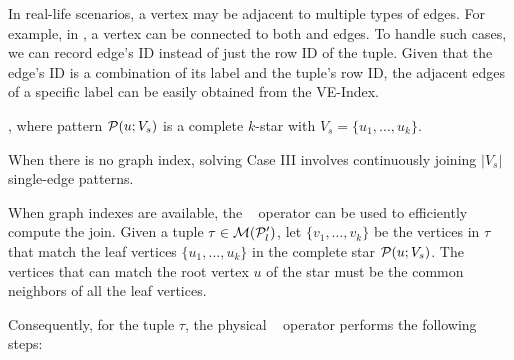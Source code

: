 In real-life scenarios, a vertex may be adjacent to multiple types of edges. For example, in , a  vertex can be connected to both  and  edges. To handle such cases, we can record edge's ID instead of just the row ID of the tuple. Given that the edge's ID is a combination of its label and the tuple's row ID, the adjacent edges of a specific label can be easily obtained from the VE-Index.

, where pattern $\mathcal{P}(u;V_s)$ is a complete $k$-star with $V_s = \{u_1, \ldots, u_k\}$. %

When there is no graph index, solving Case III involves continuously joining $|V_s|$ single-edge patterns.

When graph indexes are available, the \expandintersect~ operator can be used to efficiently compute the join. Given a tuple $\tau \in \mathcal{M}(\mathcal{P}'_l)$, let $\{v_1, \ldots, v_k\}$ be the vertices in $\tau$ that match the leaf vertices $\{u_1, \ldots, u_k\}$ in the complete star $\mathcal{P}(u;V_s)$. The vertices that can match the root vertex $u$ of the star must be the common neighbors of all the leaf vertices.

Consequently, for the tuple $\tau$, the physical \expandintersect~ operator performs the following steps:



